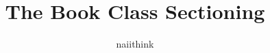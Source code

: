 \documentclass{book}
\title{The Book Class Sectioning}
\author{naiithink}
\begin{document}
\frontmatter

\maketitle

\mainmatter
\blindtext

\appendix
\blindtext

\backmatter
\blindtext
\end{document}
